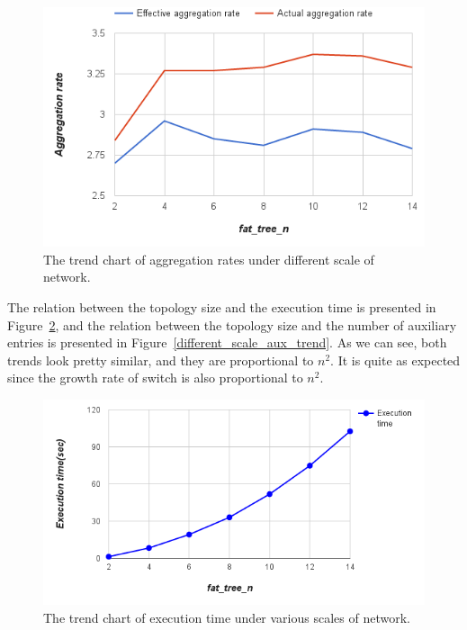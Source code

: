 \begin{figure}[H]
\begin{center} 
\includegraphics[width=1\textwidth]{figures/exp_scale_rate_trend.png}
\end{center}
\caption{The trend chart of aggregation rates under different scale of network.}
\label{different_scale_rate_trend}
\end{figure}

The relation between the topology size and the execution time is presented in Figure~\ref{different_scale_time_trend}, and the relation between the topology size and the number of auxiliary entries is presented in Figure~\ref{different_scale_aux_trend}. As we can see, both trends look pretty similar, and they are proportional to $n^2$. It is quite as expected since the growth rate of switch is also proportional to $n^2$.

\begin{figure}[H]
\begin{center} 
\includegraphics[width=1\textwidth]{figures/exp_scale_time_trend.png}
\end{center}
\caption{The trend chart of execution time under various scales of network.}
\label{different_scale_time_trend}
\end{figure}

